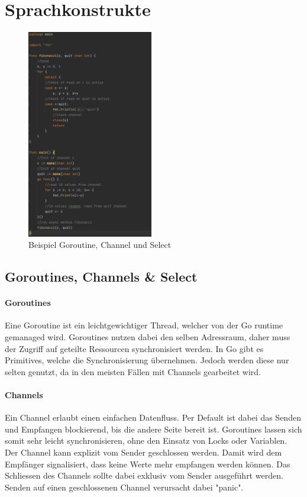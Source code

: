 \documentclass[12pt,titlepage]{article}
\begin{document}
\section{Sprachkonstrukte}
\begin{figure}
	\includegraphics[width=5.5cm]{fibGoroutine}
	\caption{Beispiel Goroutine, Channel und Select}\label{img: fibGoroutine}
\end{figure}
\subsection{Goroutines, Channels \& Select}

\paragraph{Goroutines}
Eine Goroutine ist ein leichtgewichtiger Thread, welcher von der Go runtime gemanaged wird.
Goroutines nutzen dabei den selben Adressraum, daher muss der Zugriff auf geteilte Ressourcen synchronisiert werden.
In Go gibt es Primitives, welche die Synchronisierung übernehmen. Jedoch werden diese nur selten genutzt, da in den meisten Fällen mit Channels gearbeitet wird.
\paragraph{Channels}
Ein Channel erlaubt einen einfachen Datenfluss. Per Default ist dabei das Senden und Empfangen blockierend, bis die andere Seite bereit ist. Goroutines lassen sich somit sehr leicht synchronisieren, ohne den Einsatz von Locks oder Variablen. Der Channel kann explizit vom Sender geschlossen werden. Damit wird dem Empfänger signalisiert, dass keine Werte mehr empfangen werden können. Das Schliessen des Channels sollte dabei exklusiv vom Sender ausgeführt werden. Senden auf einen geschlossenen Channel verursacht dabei "panic".
\end{document}
